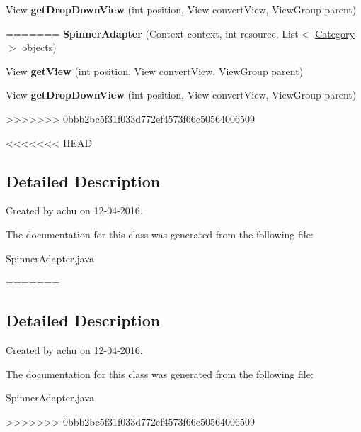 \begin{DoxyCompactItemize}
\item 
\hypertarget{classcom_1_1example_1_1sel_1_1lostfound_1_1SpinnerAdapter_a338cec7659aa976e986e4d1c843d4041}{View {\bfseries get\-Drop\-Down\-View} (int position, View convert\-View, View\-Group parent)}\label{classcom_1_1example_1_1sel_1_1lostfound_1_1SpinnerAdapter_a338cec7659aa976e986e4d1c843d4041}
=======
\hypertarget{classcom_1_1example_1_1sel_1_1lostfound_1_1SpinnerAdapter_a9cbc724bbe142a941090cc9bf5b8bcb6}{{\bfseries \-Spinner\-Adapter} (\-Context context, int resource, \-List$<$ \hyperlink{classcom_1_1example_1_1sel_1_1lostfound_1_1Category}{\-Category} $>$ objects)}\label{classcom_1_1example_1_1sel_1_1lostfound_1_1SpinnerAdapter_a9cbc724bbe142a941090cc9bf5b8bcb6}

\item 
\hypertarget{classcom_1_1example_1_1sel_1_1lostfound_1_1SpinnerAdapter_ac19132459aeaef196c367a156bb03e0e}{\-View {\bfseries get\-View} (int position, \-View convert\-View, \-View\-Group parent)}\label{classcom_1_1example_1_1sel_1_1lostfound_1_1SpinnerAdapter_ac19132459aeaef196c367a156bb03e0e}

\item 
\hypertarget{classcom_1_1example_1_1sel_1_1lostfound_1_1SpinnerAdapter_a338cec7659aa976e986e4d1c843d4041}{\-View {\bfseries get\-Drop\-Down\-View} (int position, \-View convert\-View, \-View\-Group parent)}\label{classcom_1_1example_1_1sel_1_1lostfound_1_1SpinnerAdapter_a338cec7659aa976e986e4d1c843d4041}
>>>>>>> 0bbb2bc5f31f033d772ef4573f66c50564006509

\end{DoxyCompactItemize}


<<<<<<< HEAD
\subsection{Detailed Description}
Created by achu on 12-\/04-\/2016. 

The documentation for this class was generated from the following file\-:\begin{DoxyCompactItemize}
\item 
Spinner\-Adapter.\-java\end{DoxyCompactItemize}
=======
\subsection{\-Detailed \-Description}
\-Created by achu on 12-\/04-\/2016. 

\-The documentation for this class was generated from the following file\-:\begin{DoxyCompactItemize}
\item 
\-Spinner\-Adapter.\-java\end{DoxyCompactItemize}
>>>>>>> 0bbb2bc5f31f033d772ef4573f66c50564006509
